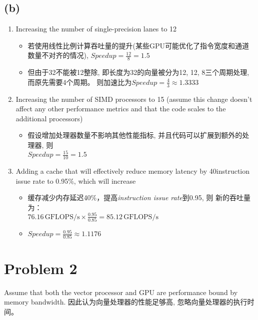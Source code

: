 \documentclass{article}
\begin{document}
\subsection*{(b)}
\begin{enumerate}
    \item Increasing the number of single-precision lanes to 12
          \begin{itemize}
              \item 若使用线性比例计算吞吐量的提升(某些GPU可能优化了指令宽度和通道数量不对齐的情况), $ Speedup = \frac{12}{8} = 1.5$
              \item 但由于32不能被12整除, 即长度为32的向量被分为12, 12, 8三个周期处理, 而原先需要4个周期。
                    则加速比为$ Speedup = \frac{4}{3} \approx 1.3333 $
          \end{itemize}

    \item Increasing the number of SIMD processors to 15 (assume this change doesn't
          affect any other performance metrics and that the code scales to the additional
          processors)
          \begin{itemize}
              \item 假设增加处理器数量不影响其他性能指标, 并且代码可以扩展到额外的处理器, 则\\
                    $Speedup = \frac{15}{10} = 1.5$
          \end{itemize}

    \item Adding a cache that will effectively reduce memory latency by 40instruction
          issue rate to 0.95\%, which will increase
          \begin{itemize}
              \item 缓存减少内存延迟40\%，提高\textit{instruction issue rate}到0.95,
                    则 新的吞吐量为：\\$76.16 \,\text{GFLOPS/s} \times \frac{0.95}{0.85} = 85.12 \,\text{GFLOPS/s}$
              \item $Speedup = \frac{0.95}{0.85} \approx1.1176 $
          \end{itemize}

\end{enumerate}

\section*{Problem 2}
Assume that both the vector processor and GPU are
performance bound by memory bandwidth. 因此认为向量处理器的性能足够高, 忽略向量处理器的执行时间。
\end{document}
